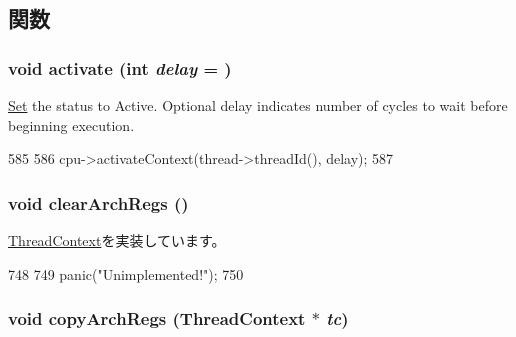 \subsection{関数}
\hypertarget{classOzoneCPU_1_1OzoneTC_a19d10e434761f745cf27de72713589bc}{
\subsubsection[{activate}]{\setlength{\rightskip}{0pt plus 5cm}void activate (int {\em delay} = {})}}
\label{classOzoneCPU_1_1OzoneTC_a19d10e434761f745cf27de72713589bc}
\hyperlink{classSet}{Set} the status to Active. Optional delay indicates number of cycles to wait before beginning execution. 


\begin{DoxyCode}
585 {
586     cpu->activateContext(thread->threadId(), delay);
587 }
\end{DoxyCode}
\hypertarget{classOzoneCPU_1_1OzoneTC_ad5c88ea41846742bd8c70d9c50f31945}{
\subsubsection[{clearArchRegs}]{\setlength{\rightskip}{0pt plus 5cm}void clearArchRegs ()}}
\label{classOzoneCPU_1_1OzoneTC_ad5c88ea41846742bd8c70d9c50f31945}


\hyperlink{classThreadContext_ae0375c0a094eeb6fe8f73db4393d4ceb}{ThreadContext}を実装しています。


\begin{DoxyCode}
748 {
749     panic("Unimplemented!");
750 }
\end{DoxyCode}
\hypertarget{classOzoneCPU_1_1OzoneTC_a01b372f805c92c90e6148b76d23d6236}{
\subsubsection[{copyArchRegs}]{\setlength{\rightskip}{0pt plus 5cm}void copyArchRegs ({\bf ThreadContext} $\ast$ {\em tc})}}
\label{classOzoneCPU_1_1OzoneTC_a01b372f805c92c90e6148b76d23d6236}



